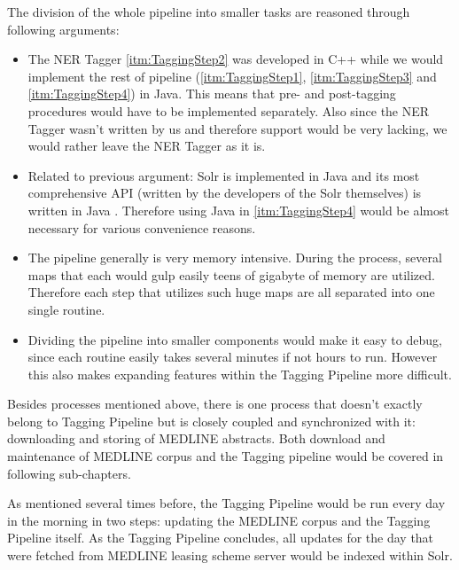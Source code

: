 The division of the whole pipeline into smaller tasks are reasoned through following arguments:
\begin{itemize}
\item The NER Tagger \ref{itm:TaggingStep2} was developed in C++ while we would implement the rest of pipeline (\ref{itm:TaggingStep1}, \ref{itm:TaggingStep3} and \ref{itm:TaggingStep4}) in Java. This means that pre- and post-tagging procedures would have to be implemented separately. Also since the NER Tagger wasn't written by us and therefore support would be very lacking, we would rather leave the NER Tagger as it is.
\item Related to previous argument: Solr is implemented in Java and its most comprehensive API (written by the developers of the Solr themselves) is written in Java \citep{grainger2014solr}. Therefore using Java in \ref{itm:TaggingStep4} would be almost necessary for various convenience reasons.
\item The pipeline generally is very memory intensive. During the process, several maps that each would gulp easily teens of gigabyte of memory are utilized. Therefore each step that utilizes such huge maps are all separated into one single routine.
\item Dividing the pipeline into smaller components would make it easy to debug, since each routine easily takes several minutes if not hours to run. However this also makes expanding features within the Tagging Pipeline more difficult.
\end{itemize}

Besides processes mentioned above, there is one process that doesn't exactly belong to Tagging Pipeline but is closely coupled and synchronized with it: downloading and storing of MEDLINE abstracts. Both download and maintenance of MEDLINE corpus and the Tagging pipeline would be covered in following sub-chapters.

As mentioned several times before, the Tagging Pipeline would be run every day in the morning in two steps: updating the MEDLINE corpus and the Tagging Pipeline itself. As the Tagging Pipeline concludes, all updates for the day that were fetched from MEDLINE leasing scheme server \citep{MEDLINE} would be indexed within Solr.

